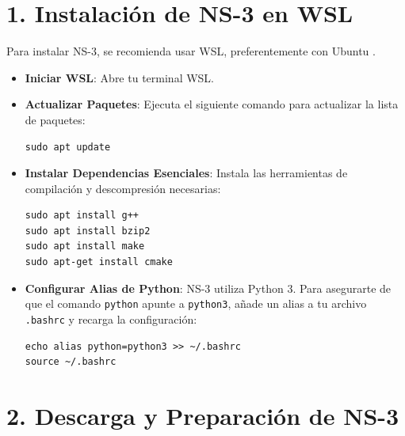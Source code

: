 \documentclass{article}
\begin{document}
\section*{\textbf{1. Instalación de NS-3 en WSL}}
Para instalar NS-3, se recomienda usar WSL, preferentemente con Ubuntu .

\begin{itemize}
    \item \textbf{Iniciar WSL}: Abre tu terminal WSL.
    \item \textbf{Actualizar Paquetes}: Ejecuta el siguiente comando para actualizar la lista de paquetes:
    \begin{lstlisting}
sudo apt update 
    \end{lstlisting}
    \item \textbf{Instalar Dependencias Esenciales}: Instala las herramientas de compilación y descompresión necesarias:
    \begin{lstlisting}
sudo apt install g++
sudo apt install bzip2
sudo apt install make 
sudo apt-get install cmake 
    \end{lstlisting}
    \item \textbf{Configurar Alias de Python}: NS-3 utiliza Python 3. Para asegurarte de que el comando \texttt{python} apunte a \texttt{python3}, añade un alias a tu archivo \texttt{.bashrc} y recarga la configuración:
    \begin{lstlisting}
echo alias python=python3 >> ~/.bashrc 
source ~/.bashrc 
    \end{lstlisting}
\end{itemize}

\section*{\textbf{2. Descarga y Preparación de NS-3}}
\end{document}
